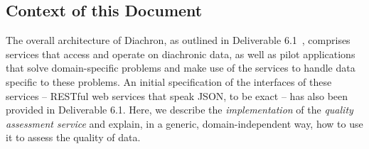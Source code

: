 
\subsection{Context of this Document}
\label{sec:ContextDoc} 

The overall architecture of Diachron, as outlined in Deliverable 6.1~\cite{diachron-d6.1}, comprises services that access and operate on diachronic data, as well as pilot applications that solve domain-specific problems and make use of the services to handle data specific to these problems.  An initial specification of the interfaces of these services – RESTful web services that speak JSON, to be exact – has also been provided in Deliverable 6.1.  Here, we describe the \emph{implementation} of the \emph{quality assessment service} and explain, in a generic, domain-independent way, how to use it to assess the quality of data.


